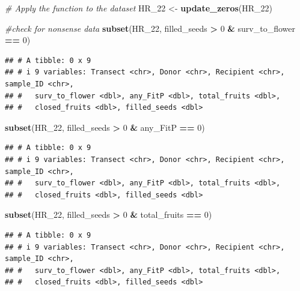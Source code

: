 \documentclass[
]{article}
\newenvironment{Shaded}{\begin{snugshade}}{\end{snugshade}}
\newcommand{\CommentTok}[1]{\textcolor[rgb]{0.56,0.35,0.01}{\textit{#1}}}
\newcommand{\DecValTok}[1]{\textcolor[rgb]{0.00,0.00,0.81}{#1}}
\newcommand{\FunctionTok}[1]{\textcolor[rgb]{0.13,0.29,0.53}{\textbf{#1}}}
\newcommand{\NormalTok}[1]{#1}
\newcommand{\OtherTok}[1]{\textcolor[rgb]{0.56,0.35,0.01}{#1}}
\newcommand{\SpecialCharTok}[1]{\textcolor[rgb]{0.81,0.36,0.00}{\textbf{#1}}}
\begin{document}
\begin{Shaded}
\begin{Highlighting}[]
\CommentTok{\# Apply the function to the dataset}
\NormalTok{HR\_22 }\OtherTok{\textless{}{-}} \FunctionTok{update\_zeros}\NormalTok{(HR\_22)}
\end{Highlighting}
\end{Shaded}

\begin{Shaded}
\begin{Highlighting}[]
\CommentTok{\#check for nonsense data}
\FunctionTok{subset}\NormalTok{(HR\_22, filled\_seeds }\SpecialCharTok{\textgreater{}} \DecValTok{0} \SpecialCharTok{\&}\NormalTok{ surv\_to\_flower }\SpecialCharTok{==} \DecValTok{0}\NormalTok{)}
\end{Highlighting}
\end{Shaded}

\begin{verbatim}
## # A tibble: 0 x 9
## # i 9 variables: Transect <chr>, Donor <chr>, Recipient <chr>, sample_ID <chr>,
## #   surv_to_flower <dbl>, any_FitP <dbl>, total_fruits <dbl>,
## #   closed_fruits <dbl>, filled_seeds <dbl>
\end{verbatim}

\begin{Shaded}
\begin{Highlighting}[]
\FunctionTok{subset}\NormalTok{(HR\_22, filled\_seeds }\SpecialCharTok{\textgreater{}} \DecValTok{0} \SpecialCharTok{\&}\NormalTok{ any\_FitP }\SpecialCharTok{==} \DecValTok{0}\NormalTok{)}
\end{Highlighting}
\end{Shaded}

\begin{verbatim}
## # A tibble: 0 x 9
## # i 9 variables: Transect <chr>, Donor <chr>, Recipient <chr>, sample_ID <chr>,
## #   surv_to_flower <dbl>, any_FitP <dbl>, total_fruits <dbl>,
## #   closed_fruits <dbl>, filled_seeds <dbl>
\end{verbatim}

\begin{Shaded}
\begin{Highlighting}[]
\FunctionTok{subset}\NormalTok{(HR\_22, filled\_seeds }\SpecialCharTok{\textgreater{}} \DecValTok{0} \SpecialCharTok{\&}\NormalTok{ total\_fruits }\SpecialCharTok{==} \DecValTok{0}\NormalTok{)}
\end{Highlighting}
\end{Shaded}

\begin{verbatim}
## # A tibble: 0 x 9
## # i 9 variables: Transect <chr>, Donor <chr>, Recipient <chr>, sample_ID <chr>,
## #   surv_to_flower <dbl>, any_FitP <dbl>, total_fruits <dbl>,
## #   closed_fruits <dbl>, filled_seeds <dbl>
\end{verbatim}
\end{document}
